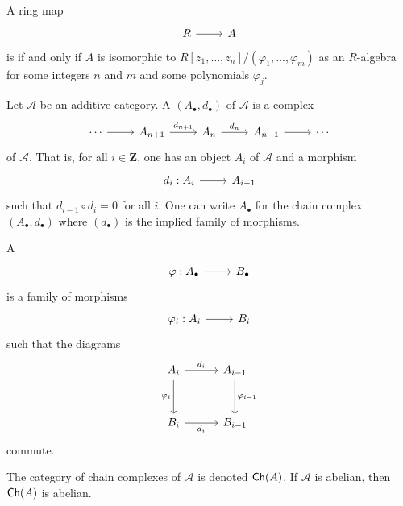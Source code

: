 \documentclass [11 pt, oneside] {article}
\begin{document}
\begin{definition}[ ]\label{}\text{}
A ring map 
\[
\begin{tikzcd}
R\ar[r]&A
\end{tikzcd}
\] 
is  if and only if $A$ is isomorphic to $R[z_1,\hdots,z_n]/(\varphi_1,\hdots,\varphi_m)$ as an $R$-algebra for some integers $n$ and $m$ and some polynomials $\varphi_j$.
\end{definition}

\begin{definition}[ ]\label{}\text{}
Let $\mathscr{A}$ be an additive category. A  $(A_\bullet, d_\bullet)$ of $\mathscr{A}$ is a complex
\[
\begin{tikzcd}
	\cdots \ar[r] & A_{n+1} \ar[r,"d_{n+1}"] & A_n \ar[r,"d_n"] & A_{n-1}\ar[r] &\cdots
\end{tikzcd}
\]
of $\mathscr{A}$. That is, for all $i\in \mathbf{Z}$, one has an object $A_i$ of $\mathscr{A}$ and a morphism 
\[
\begin{tikzcd}
d_i : A_i\ar[r]& A_{i-1}
\end{tikzcd}
\] 
such that $d_{i-1}\circ d_i = 0$ for all $i$. One can write $A_\bullet$ for the chain complex $(A_\bullet, d_\bullet) $ where $(d_\bullet)$ is the implied family of morphisms. 

A  
\[
\begin{tikzcd}
\varphi:A_\bullet \ar[r]& B_\bullet
\end{tikzcd}
\] 
is a family of morphisms 
\[
\begin{tikzcd}
\varphi_i :A_i\ar[r]& B_i
\end{tikzcd}
\] 
 such that the diagrams
\[
\begin{tikzcd}[row sep = 3 em, column sep = 3 em]
	A_i \ar[r,"d_i"] \ar[d, "\varphi_i", swap] &A_{i-1}\ar[d,"\varphi_{i-1}"] \\B_i\ar[r,"d_i", swap] & B_{i-1}
\end{tikzcd}
\]
commute.

The category of chain complexes of $\mathscr{A}$ is denoted $\textsf{Ch}(\relax{A})$. If $\mathscr{A}$ is abelian, then $\textsf{Ch}(\relax{A})$ is abelian.

\end{definition}
\end{document}
